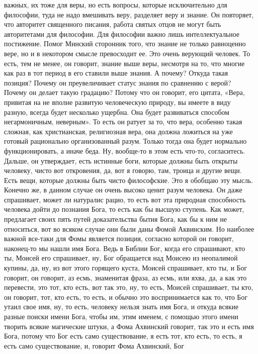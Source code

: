 важных, их тоже для веры, но есть вопросы, которые исключительно для философии,
туда не надо вмешивать веру, разделяет веру и знание. Он повторяет, что
авторитет священного писания, работа святых отцов не могут быть авторитетами для
философии. Для философии важно лишь интеллектуальное постижение. Помог Минский
сторонник того, что знание не только равноценно вере, но и в некотором смысле
превосходит ее. Это очень верующий человек. То есть, тем не менее, он говорит,
знание выше веры, несмотря на то, что многие как раз в тот период в его ставили
выше знания. А почему? Откуда такая позиция? Почему он преувеличивает статус
знания по сравнению с верой? Почему он делает такую градацию? Потому что он
говорит, его цитата, «Вера, привитая на не вполне развитую человеческую природу,
вы имеете в виду разную, всегда будет несколько ущербна. Она будет развиваться
способом негармоничным, неверным». То есть он ратует за то, что вера, особенно
такая сложная, как христианская, религиозная вера, она должна ложиться на уже
готовый рационально организованный разум. Только тогда она будет нормально
функционировать, а иначе беда. Ну, вообще-то в этом есть что-то, согласитесь.
Дальше, он утверждает, есть истинные боги, которые должны быть открыты человеку,
чисто вот откровения, да, вот я говорю, там, троица и другие вещи. Есть вещи,
которые должны быть чисто философские. Это я обобщаю эту мысль. Конечно же, в
данном случае он очень высоко ценит разум человека. Он даже спрашивает, может ли
натуралис рацио, то есть вот эта природная способность человека дойти до
познания Бога, то есть как бы высшую ступень. Как может, предлагает своих пять
путей доказательства бытия Бога, как бы к ним не относиться, вот во всяком
случае они были даны Фомой Аквинским. Но наиболее важной все-таки для Фомы
является позиция, согласно которой он говорит, наконец-то мы нашли имя Бога.
Ведь в Библии Бог, когда его спрашивают, кто ты, Моисей его спрашивает, ну, Бог
обращается над Моисею из неопалимой купины, да, ну, из вот этого горящего куста,
Моисей спрашивает, кто ты, и Бог говорит, он говорит, аз есмь, знаменитая фраза,
аз есмь, или яхва, да, а как это перевести, это тот, кто есть, вот так это, ну,
то есть, Моисей спрашивает, ты кто, он говорит, тот, кто есть, то есть, и обычно
это воспринимается как то, что Бог утаил свое имя, ну, то есть, человеку нельзя
знать имя Бога, и откуда всякие разные поиски имени Бога, чтобы им, этим именем,
с помощью этого имени творить всякие магические штуки, а Фома Ахвинский говорит,
так это и есть имя Бога, потому что Бог есть само существование, я есть тот, кто
есть, то есть, я есть само существование, и, говорит Фома Ахвинский, Бог
